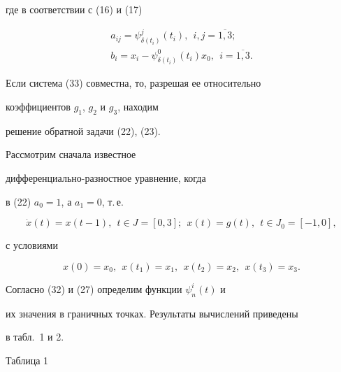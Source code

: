 где в соответствии с (16) и (17)


\begin{gather}


a_{ij}=\psi_{\delta(t_i)}^j(t_i),\ \ i,j=\overline{1,3};\\


b_i=x_i-\psi_{\delta(t_i)}^0(t_i)x_0,\ \ i=\overline{1,3}.


\end{gather}


Если система (33) совместна, то, разрешая ее относительно


коэффициентов $g_1$, $g_2$ и $g_3$, находим


решение обратной задачи (22), (23).





\begin{exam}


Рассмотрим сначала известное


дифференциально-разностное уравнение, когда


в (22) $a_0=1$, а $a_1=0$, т.\,е.


\begin{equation}


\Dot{x}(t)=x(t-1),\ \ t\in J=[0,3];\ \


x(t)=g(t),\ \ t\in J_0=[-1,0],


\end{equation}


с условиями


\begin{equation}


x(0)=x_0,\ \ x(t_1)=x_1,\ \ x(t_2)=x_2,\ \ x(t_3)=x_3.


\end{equation}


Согласно (32) и (27) определим функции $\psi_n^i(t)$ и


их значения в граничных точках. Результаты вычислений приведены


в табл.~1 и 2.


\medskip





\begin{center}


\hspace{100mm} Таблица 1 


\medskip






\end{center}
\end{exam}
